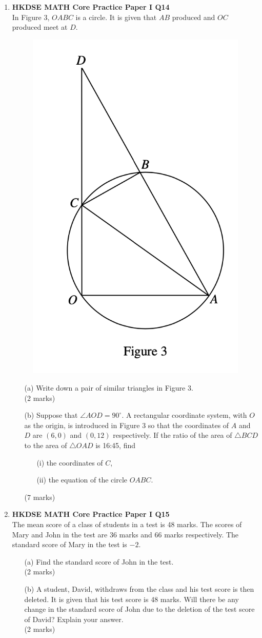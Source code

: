 \documentclass[12pt]{article}
\begin{document}
\begin{enumerate}
	\item \textbf{HKDSE MATH Core Practice Paper I Q14}\\
	In Figure 3, $OABC$ is a circle. It is given that $AB$ produced and $OC$ produced meet at $D$.
	\begin{figure}[H]
		\centering
		\includegraphics[width = .5\linewidth]{PPFigure1.3}
	\end{figure}
	\begin{enumerate}
		\item[(a)] Write down a pair of similar triangles in Figure 3. \\(2 marks)
		\item[(b)] Suppose that $\angle AOD = 90^\circ$. A rectangular coordinate system, with $O$ as the origin, is introduced in Figure 3 so that the coordinates of $A$ and $D$ are $(6,0)$ and $(0,12)$ respectively. If the ratio of the area of $\triangle BCD$ to the area of $\triangle OAD$ is 16:45, find
		\begin{enumerate}
			\item[(i)] the coordinates of $C$,
			\item[(ii)] the equation of the circle $OABC$.
		\end{enumerate}
		(7 marks)
	\end{enumerate}

	\item \textbf{HKDSE MATH Core Practice Paper I Q15}\\
	The mean score of a class of students in a test is 48 marks. The scores of Mary and John in the test are 36 marks and 66 marks respectively. The standard score of Mary in the test is $-2$.
	\begin{enumerate}
		\item[(a)] Find the standard score of John in the test. \\(2 marks)
		\item[(b)] A student, David, withdraws from the class and his test score is then deleted. It is given that his test score is 48 marks. Will there be any change in the standard score of John due to the deletion of the test score of David? Explain your answer. \\(2 marks)
	\end{enumerate}	



\end{enumerate}
\end{document}
